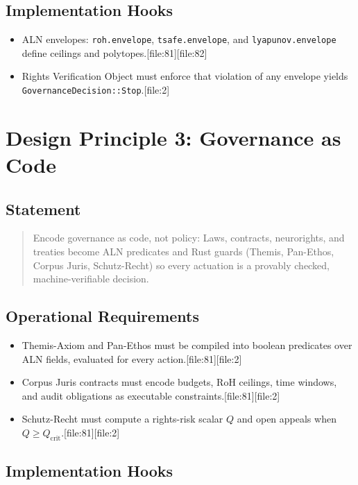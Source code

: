 \documentclass[11pt]{article}
\begin{document}
\subsection{Implementation Hooks}

\begin{itemize}[nosep]
  \item ALN envelopes: \texttt{roh.envelope}, \texttt{tsafe.envelope}, and \texttt{lyapunov.envelope} define ceilings and polytopes.[file:81][file:82]
  \item Rights Verification Object must enforce that violation of any envelope yields \texttt{GovernanceDecision::Stop}.[file:2]
\end{itemize}

\section{Design Principle 3: Governance as Code}

\subsection{Statement}

\begin{quote}
Encode governance as code, not policy: Laws, contracts, neurorights, and treaties become ALN predicates and Rust guards (Themis, Pan-Ethos, Corpus Juris, Schutz-Recht) so every actuation is a provably checked, machine-verifiable decision.
\end{quote}

\subsection{Operational Requirements}

\begin{itemize}[nosep]
  \item Themis-Axiom and Pan-Ethos must be compiled into boolean predicates over ALN fields, evaluated for every action.[file:81][file:2]
  \item Corpus Juris contracts must encode budgets, RoH ceilings, time windows, and audit obligations as executable constraints.[file:81][file:2]
  \item Schutz-Recht must compute a rights-risk scalar \(Q\) and open appeals when \(Q \geq Q_{\mathrm{crit}}\).[file:81][file:2]
\end{itemize}

\subsection{Implementation Hooks}
\end{document}
